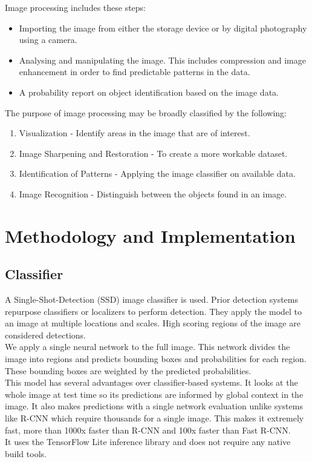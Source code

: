 \documentclass[a4paper,conference]{IEEEtran}
\begin{document}
Image processing includes these steps:

\begin{itemize}
\item Importing the image from either the storage device or by digital photography using a camera.
\item Analysing and manipulating the image. This includes compression and image enhancement in order to find predictable patterns in the data.
\item A probability report on object identification based on the image data.
\end{itemize}


The purpose of image processing may be broadly classified by the following:

\begin{enumerate}
\item Visualization - Identify areas in the image that are of interest.
\item Image Sharpening and Restoration - To create a more workable dataset.
\item Identification of Patterns - Applying the image classifier on available data.
\item Image Recognition - Distinguish between the objects found in an image.

\end{enumerate}

	\section{Methodology and Implementation} \label{section:methodology}
	
	\subsection{Classifier} \label{subsection:classifier}

	A Single-Shot-Detection (SSD) image classifier is used. Prior detection systems repurpose classifiers or localizers to perform detection. They apply the model to an image at multiple locations and scales. High scoring regions of the image are considered detections. \\We apply a single neural network to the full image. This network divides the image into regions and predicts bounding boxes and probabilities for each region. These bounding boxes are weighted by the predicted probabilities.\\
	\newline
	This model has several advantages over classifier-based systems. It looks at the whole image at test time so its predictions are informed by global context in the image. It also makes predictions with a single network evaluation unlike systems like R-CNN which require thousands for a single image. This makes it extremely fast, more than 1000x faster than R-CNN and 100x faster than Fast R-CNN.\\
	\newline
	It uses the TensorFlow Lite inference library and does not require any native build tools. \\
	\newline
	
\end{document}
